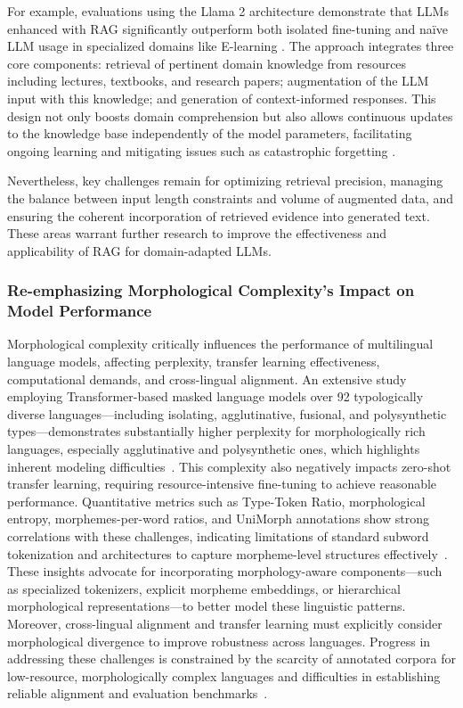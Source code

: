 \documentclass[sigconf]{acmart}
\begin{document}
For example, evaluations using the Llama 2 architecture demonstrate that LLMs enhanced with RAG significantly outperform both isolated fine-tuning and naïve LLM usage in specialized domains like E-learning \cite{ref49}. The approach integrates three core components: retrieval of pertinent domain knowledge from resources including lectures, textbooks, and research papers; augmentation of the LLM input with this knowledge; and generation of context-informed responses. This design not only boosts domain comprehension but also allows continuous updates to the knowledge base independently of the model parameters, facilitating ongoing learning and mitigating issues such as catastrophic forgetting \cite{ref49}. 

Nevertheless, key challenges remain for optimizing retrieval precision, managing the balance between input length constraints and volume of augmented data, and ensuring the coherent incorporation of retrieved evidence into generated text. These areas warrant further research to improve the effectiveness and applicability of RAG for domain-adapted LLMs.

\subsubsection{Re-emphasizing Morphological Complexity’s Impact on Model Performance}

Morphological complexity critically influences the performance of multilingual language models, affecting perplexity, transfer learning effectiveness, computational demands, and cross-lingual alignment. An extensive study employing Transformer-based masked language models over 92 typologically diverse languages—including isolating, agglutinative, fusional, and polysynthetic types—demonstrates substantially higher perplexity for morphologically rich languages, especially agglutinative and polysynthetic ones, which highlights inherent modeling difficulties~\cite{ref34}. This complexity also negatively impacts zero-shot transfer learning, requiring resource-intensive fine-tuning to achieve reasonable performance. Quantitative metrics such as Type-Token Ratio, morphological entropy, morphemes-per-word ratios, and UniMorph annotations show strong correlations with these challenges, indicating limitations of standard subword tokenization and architectures to capture morpheme-level structures effectively~\cite{ref34}. These insights advocate for incorporating morphology-aware components—such as specialized tokenizers, explicit morpheme embeddings, or hierarchical morphological representations—to better model these linguistic patterns. Moreover, cross-lingual alignment and transfer learning must explicitly consider morphological divergence to improve robustness across languages. Progress in addressing these challenges is constrained by the scarcity of annotated corpora for low-resource, morphologically complex languages and difficulties in establishing reliable alignment and evaluation benchmarks~\cite{ref34}.
\end{document}
